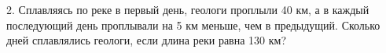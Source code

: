 2. Сплавляясь по реке в первый день, геологи проплыли 40 км, а в каждый последующий день проплывали на 5 км меньше, чем в предыдущий. Сколько дней сплавлялись геологи, если длина реки равна 130 км?\\
